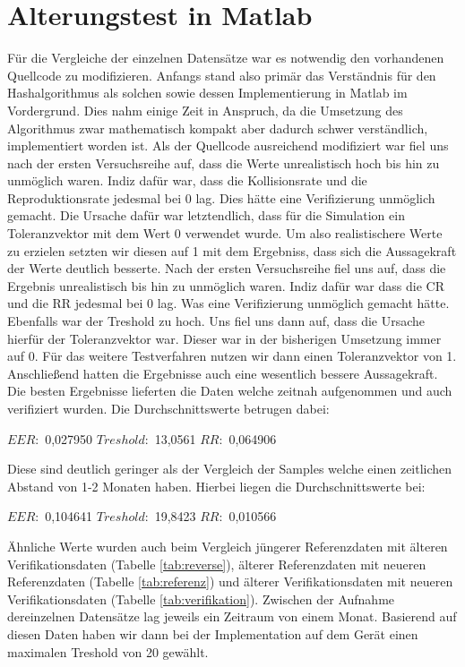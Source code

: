\section{Alterungstest in Matlab}

F\"ur die Vergleiche der einzelnen Datens\"atze war es notwendig den vorhandenen Quellcode zu modifizieren. Anfangs stand also prim\"ar das Verst\"andnis f\"ur den Hashalgorithmus als solchen sowie dessen Implementierung in Matlab im Vordergrund. Dies nahm einige Zeit in Anspruch, da die Umsetzung des Algorithmus zwar mathematisch kompakt aber dadurch schwer verst\"andlich, implementiert worden ist. Als der Quellcode ausreichend modifiziert war fiel uns nach der ersten Versuchsreihe auf, dass die Werte unrealistisch hoch bis hin zu unm\"oglich waren. Indiz daf\"ur war, dass die Kollisionsrate und die Reproduktionsrate jedesmal bei 0 lag. Dies h\"atte eine Verifizierung unm\"oglich gemacht. Die Ursache daf\"ur war letztendlich, dass f\"ur die Simulation ein Toleranzvektor mit dem Wert 0 verwendet wurde. Um also realistischere Werte zu erzielen setzten wir diesen auf 1 mit dem Ergebniss, dass sich die Aussagekraft der Werte deutlich besserte. Nach der ersten Versuchsreihe fiel uns auf, dass die Ergebnis unrealistisch bis hin zu unm\"oglich waren. Indiz daf\"ur war dass die CR und die RR jedesmal bei 0 lag. Was eine Verifizierung unm\"oglich gemacht h\"atte. Ebenfalls war der Treshold zu hoch. Uns fiel uns dann auf, dass die Ursache hierf\"ur der Toleranzvektor war. Dieser war in der bisherigen Umsetzung immer auf 0. F\"ur das weitere Testverfahren nutzen wir dann einen Toleranzvektor von 1. Anschlie{\ss}end hatten die Ergebnisse auch eine wesentlich bessere Aussagekraft. 
Die besten Ergebnisse lieferten die Daten welche zeitnah aufgenommen und auch verifiziert wurden. Die Durchschnittswerte betrugen dabei:
\newline\newline
\centerline{$EER:$ 0,027950  $Treshold:$ 13,0561  $RR:$ 0,064906}
\newline\newline\noindent
Diese sind deutlich geringer als der Vergleich der Samples welche einen zeitlichen Abstand von 1-2 Monaten haben. Hierbei liegen die Durchschnittswerte bei: 
\newline\newline
\centerline{$EER:$ 0,104641  $Treshold:$ 19,8423  $RR:$ 0,010566}
\newline\newline\noindent
\"Ahnliche Werte wurden auch beim Vergleich j\"ungerer Referenzdaten mit \"alteren Verifikationsdaten (Tabelle \ref{tab:reverse}), \"alterer Referenzdaten mit neueren Referenzdaten (Tabelle \ref{tab:referenz}) und  \"alterer Verifikationsdaten mit neueren Verifikationsdaten (Tabelle \ref{tab:verifikation}). Zwischen der Aufnahme dereinzelnen Datens\"atze lag jeweils ein Zeitraum von einem Monat. Basierend auf diesen Daten haben wir dann bei der Implementation auf dem Ger\"at einen maximalen Treshold von 20 gew\"ahlt.